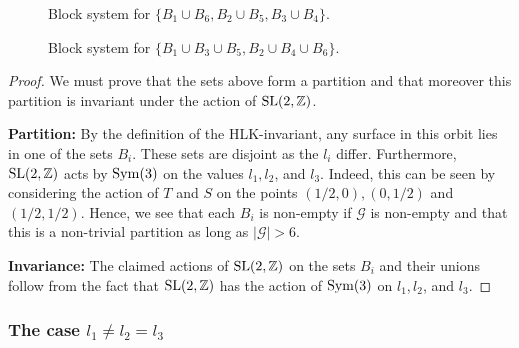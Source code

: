\documentclass[a4paper,11pt]{amsart}
\numberwithin{equation}{section}
\numberwithin{figure}{section}
\numberwithin{table}{section}
\newcommand{\Z}{\mathbb{Z}}
\newcommand{\orb}{\mathcal{G}}
\DeclareMathOperator{\SL}{{\rm{SL}}}
\DeclareMathOperator{\Sym}{{\rm{Sym}}}
\begin{document}
\begin{figure}[t]
\begin{center}
\end{center}
\caption{Block system for $\{B_{1}\cup B_{6}, B_{2}\cup B_{5}, B_{3}\cup B_{4}\}$.}
\label{fig:blocksys2}
\end{figure}

\begin{figure}[t]
\begin{center}
\end{center}
\caption{Block system for $\{B_{1}\cup B_{3}\cup B_{5},B_{2}\cup B_{4}\cup B_{6}\}$.}
\label{fig:blocksys3}
\end{figure}

\begin{proof}
We must prove that the sets above form a partition and that moreover this partition is invariant under the action of $\SL(2,\Z)$.

{\bf Partition:} By the definition of the HLK-invariant, any surface in this orbit lies in one of the sets $B_{i}$. These sets are disjoint as the $l_{i}$ differ. Furthermore, $\SL(2,\Z)$ acts by $\Sym(3)$ on the values $l_{1},l_{2}$, and $l_{3}$. Indeed, this can be seen by considering the action of $T$ and $S$ on the points $(1/2,0),(0,1/2)$ and $(1/2,1/2)$. Hence, we see that each $B_{i}$ is non-empty if $\orb$ is non-empty and that this is a non-trivial partition as long as $|\orb|>6$. 

{\bf Invariance:} The claimed actions of $\SL(2,\Z)$ on the sets $B_{i}$ and their unions follow from the fact that $\SL(2,\Z)$ has the action of $\Sym(3)$ on $l_{1}, l_{2}$, and $l_{3}$.
\end{proof}

\subsubsection{The case ${l_{1}\neq l_{2} = l_{3}}$}
\end{document}
